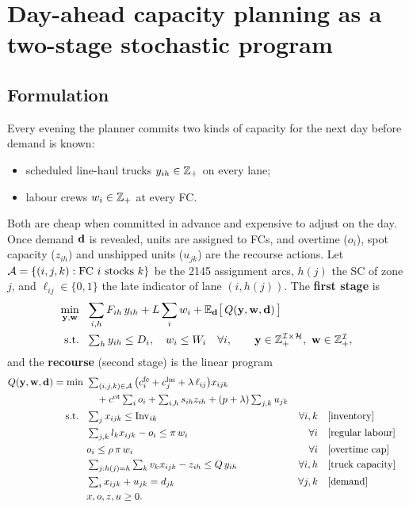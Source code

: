 \section{Day-ahead capacity planning as a two-stage stochastic program}\label{sec:planning}

\subsection{Formulation}
Every evening the planner commits two kinds of capacity for the next day before demand is known:
\begin{itemize}
  \item scheduled line-haul trucks $y_{ih}\in\mathbb{Z}_+$ on every lane;
  \item labour crews $w_i\in\mathbb{Z}_+$ at every FC.
\end{itemize}
Both are cheap when committed in advance and expensive to adjust on the day.
Once demand $\mathbf{d}$ is revealed, units are assigned to FCs, and overtime ($o_i$), spot capacity ($z_{ih}$) and unshipped units ($u_{jk}$) are the recourse actions.
Let $\mathcal{A}=\{(i,j,k): \text{FC } i \text{ stocks } k\}$ be the 2145 assignment arcs, $h(j)$ the SC of zone $j$, and $\ell_{ij}\in\{0,1\}$ the late indicator of lane $(i,h(j))$.
The \textbf{first stage} is
\begin{equation}\label{eq:first}
\begin{aligned}
  \min_{\mathbf{y},\mathbf{w}}\ \ & \sum_{i,h} F_{ih}\,y_{ih} + L\sum_i w_i + \mathbb{E}_{\mathbf{d}}\big[\,Q(\mathbf{y},\mathbf{w},\mathbf{d})\,\big]\\
  \text{s.t.}\ \ & \textstyle\sum_h y_{ih}\le D_i,\quad w_i\le W_i\quad \forall i, \qquad \mathbf{y}\in\mathbb{Z}_+^{\mathcal{I}\times\mathcal{H}},\ \mathbf{w}\in\mathbb{Z}_+^{\mathcal{I}},
\end{aligned}
\end{equation}
and the \textbf{recourse} (second stage) is the linear program
\begin{align}
  Q(\mathbf{y},\mathbf{w},\mathbf{d})=\min\ & \textstyle\sum_{(i,j,k)\in\mathcal{A}}\big(c^{\mathrm{fc}}_i + c^{\mathrm{lm}}_j + \lambda\,\ell_{ij}\big)x_{ijk} \nonumber\\
     & \textstyle\quad + c^{\mathrm{ot}}\sum_i o_i + \sum_{i,h} s_{ih} z_{ih} + (p+\lambda)\sum_{j,k}u_{jk} \label{eq:rec-obj}\\
  \text{s.t. }\ & \textstyle\sum_{j} x_{ijk} \le \mathrm{Inv}_{ik} & \forall i,k \quad &[\text{inventory}] \label{eq:inv}\\
  & \textstyle\sum_{j,k} l_k x_{ijk} - o_i \le \pi\, w_i & \forall i \quad &[\text{regular labour}] \label{eq:lab}\\
  & o_i \le \rho\,\pi\, w_i & \forall i \quad &[\text{overtime cap}] \label{eq:ot}\\
  & \textstyle\sum_{j:h(j)=h}\sum_k v_k x_{ijk} - z_{ih} \le Q\, y_{ih} & \forall i,h \quad &[\text{truck capacity}] \label{eq:lane}\\
  & \textstyle\sum_{i} x_{ijk} + u_{jk} = d_{jk} & \forall j,k \quad &[\text{demand}] \label{eq:dem}\\
  & x,o,z,u\ge 0. \nonumber
\end{align}
